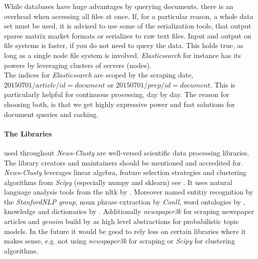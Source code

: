   While databases have huge advantages by querying documents, there is an overhead when accessing all files at once. If, for a particular reason, a whole data set must be used, it is advised to use some of the serialization tools, that output sparse matrix market formats or serializes to raw text files. Input and output on file systems is faster, if you do not need to query the data. This holds true, as long as a single node file system is involved. \emph{Elasticsearch} for instance has its powers by leveraging clusters of servers (nodes).\\ 
  The indices for \emph{Elasticsearch} are scoped by the scraping date, $20150701/article/id = document$ or $20150701/prep/id = document$. This is particularly helpful for continuous processing, day by day. The reason for choosing both, is that we get highly expressive power and fast solutions for document queries and caching.

  \paragraph{The Libraries} used throughout \emph{News-Clusty} are well-versed scientific data processing libraries. The library creators and maintainers should be mentioned and accredited for. \emph{News-Clusty} leverages linear algebra, feature selection strategies and clustering algorithms from \emph{Scipy} (especially numpy and sklearn) see \cite{ScikitLearn}. It uses natural language analysis tools from the nltk by \cite{NltkPython}. Moreover named entitiy recognition by the \emph{StanfordNLP group}, noun phrase extraction by \emph{Conll}, word ontologies by \wordnet{}, knowledge and dictionaries by \wiki{}. Additionally \emph{newspaper3k} for scraping newspaper articles and \emph{gensim} build by \cite{gensim2010} as high level abstractions for probabilistic topic models. In the future it would be good to rely less on certain libraries where it makes sense, e.g. not using \emph{newspaper3k} for scraping or \emph{Scipy} for clustering algorithms.



